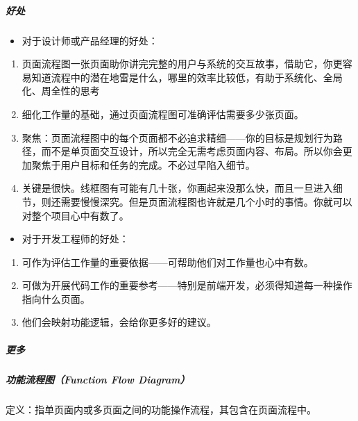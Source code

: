 \documentclass[letterpaper,11pt,english]{sphinxmanual}
\begin{document}
\subparagraph{好处}
\label{\detokenize{chapter_knowledge/flow_chart:id11}}\begin{itemize}
\item {} 
对于设计师或产品经理的好处：

\end{itemize}
\begin{enumerate}
%
\item {} 
页面流程图一张页面助你讲完完整的用户与系统的交互故事，借助它，你更容易知道流程中的潜在地雷是什么，哪里的效率比较低，有助于系统化、全局化、周全性的思考

\item {} 
细化工作量的基础，通过页面流程图可准确评估需要多少张页面。

\item {} 
聚焦：页面流程图中的每个页面都不必追求精细——你的目标是规划行为路径，而不是单页面交互设计，所以完全无需考虑页面内容、布局。所以你会更加聚焦于用户目标和任务的完成。不必过早陷入细节。

\item {} 
关键是很快。线框图有可能有几十张，你画起来没那么快，而且一旦进入细节，则还需要慢慢深究。但是页面流程图也许就是几个小时的事情。你就可以对整个项目心中有数了。

\end{enumerate}
\begin{itemize}
\item {} 
对于开发工程师的好处：

\end{itemize}
\begin{enumerate}
%
\item {} 
可作为评估工作量的重要依据——可帮助他们对工作量也心中有数。

\item {} 
可做为开展代码工作的重要参考——特别是前端开发，必须得知道每一种操作指向什么页面。

\item {} 
他们会映射功能逻辑，会给你更多好的建议。

\end{enumerate}


\subparagraph{更多}
\label{\detokenize{chapter_knowledge/flow_chart:id12}}


\subparagraph{功能流程图（Function Flow Diagram）}
\label{\detokenize{chapter_knowledge/flow_chart:function-flow-diagram}}
定义：指单页面内或多页面之间的功能操作流程，其包含在页面流程中。
\end{document}

